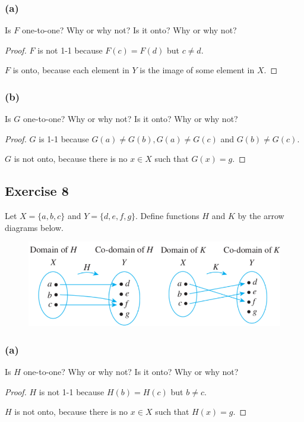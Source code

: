 \documentclass[14pt]{extarticle}
\begin{document}
\subsubsection{(a)}
Is $F$ one-to-one? Why or why not? Is it onto? Why or why not?

\begin{proof}
$F$ is not 1-1 because $F(c) = F(d)$ but $c \neq d$.

$F$ is onto, because each element in $Y$ is the image of some element in $X$.
\end{proof}

\subsubsection{(b)}
Is $G$ one-to-one? Why or why not? Is it onto? Why or why not?

\begin{proof}
$G$ is 1-1 because $G(a) \neq G(b), G(a) \neq G(c)$ and $G(b) \neq G(c)$.

$G$ is not onto, because there is no $x \in X$ such that $G(x) = g$.
\end{proof}

\subsection{Exercise 8}
Let \(X = \{a, b, c\}\) and \(Y = \{d, e, f, g\}\). Define
functions $H$ and $K$ by the arrow diagrams below.

\begin{figure}[ht!]
\centering
\includegraphics[scale=0.5]{../images/7.2.8.png}
\end{figure}

\subsubsection{(a)}
Is $H$ one-to-one? Why or why not? Is it onto? Why or why not?

\begin{proof}
$H$ is not 1-1 because \(H(b) = H(c)\) but \(b \neq c\).

$H$ is not onto, because there is no $x \in X$ such that $H(x) = g$.
\end{proof}
\end{document}
